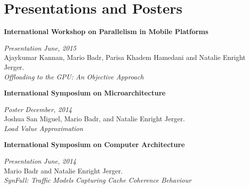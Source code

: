 \section{\sc Presentations and Posters}

{\bf International Workshop on Parallelism in Mobile Platforms}
\vspace{-.3cm}

{\em Presentation} \hfill {\em June, 2015}\\
Ajaykumar Kannan, Mario Badr, Parisa Khadem Hamedani and Natalie Enright Jerger.\\
\textit{Offloading to the GPU: An Objective Approach}


{\bf International Symposium on Microarchitecture}
\vspace{-.3cm}

{\em Poster} \hfill {\em December, 2014}\\
Joshua San Miguel, Mario Badr, and Natalie Enright Jerger.\\
\textit{Load Value Approximation}

{\bf International Symposium on Computer Architecture}
\vspace{-.3cm}

{\em Presentation} \hfill {\em June, 2014}\\
Mario Badr and Natalie Enright Jerger.\\
\textit{SynFull: Traffic Models Capturing Cache Coherence Behaviour}




